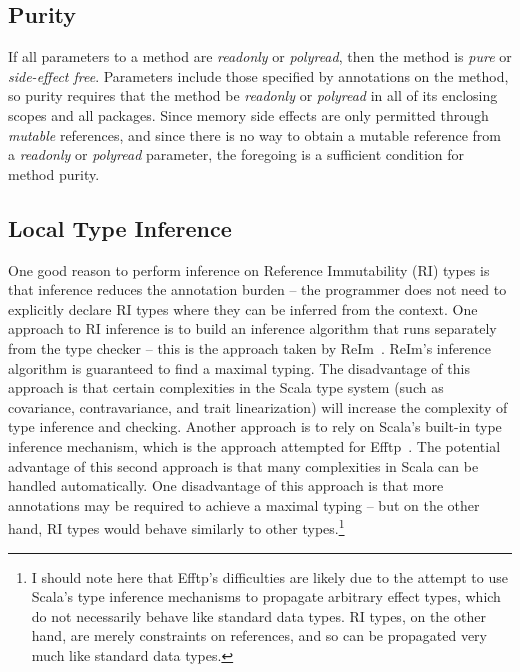\documentclass[letterpaper,11pt]{article}
\theoremstyle{definition}
\theoremstyle{remark}
\begin{document}




\subsection{Purity}

If all parameters to a method are \emph{readonly} or \emph{polyread},
then the method is \emph{pure} or \emph{side-effect free}.
Parameters include those specified by annotations on the method,
so purity requires that the method be \emph{readonly} or \emph{polyread}
in all of its enclosing scopes and all packages.
Since memory side effects are only permitted through \emph{mutable} references,
and since there is no way to obtain a mutable reference from
a \emph{readonly} or \emph{polyread} parameter, the foregoing is a
sufficient condition for method purity.

\subsection{Local Type Inference}

One good reason to perform inference on Reference Immutability (RI) types is that inference
reduces the annotation burden -- the programmer does not need to
explicitly declare RI types where they can be inferred from the context.
One approach to RI inference is to build an inference algorithm that runs
separately from the type checker -- this is the approach taken by ReIm~\cite{reim}.
ReIm's inference algorithm is guaranteed to find a maximal typing.
The disadvantage of this approach is that certain complexities
in the Scala type system (such as covariance, contravariance, and trait linearization)
will increase the complexity of type inference and checking.
Another approach is to rely on Scala's built-in type inference mechanism,
which is the approach attempted for Efftp~\cite{efftp}.
The potential advantage of this second approach is that many complexities
in Scala can be handled automatically.
One disadvantage of this approach is that more annotations may be required to
achieve a maximal typing -- but on the other hand, RI types would behave
similarly to other types.\footnote{I should note here that Efftp's difficulties are
likely due to the attempt to use Scala's type inference mechanisms to
propagate arbitrary effect types, which do not necessarily
behave like standard data types. RI types, on the other hand, are merely constraints
on references, and so can be propagated very much like standard data types.}
\end{document}
